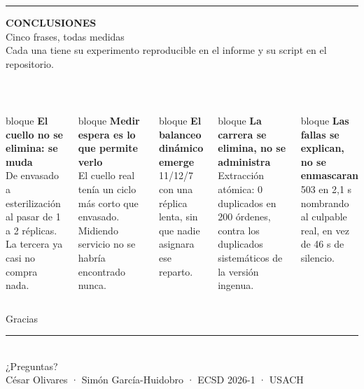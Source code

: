 \documentclass[aspectratio=169,10pt]{beamer}
\newcommand{\ligera}{\sffamily}
\newcommand{\antetitulo}{\sffamily\bfseries}
\newcommand{\lamina}[3]{%
  \vspace{0.05cm}%
  \noindent\textcolor{tealu}{\rule[-0.92cm]{2.6pt}{1.32cm}}\hspace{0.32cm}%
  \begin{minipage}[t]{0.92\linewidth}
    {\antetitulo\scriptsize\color{tealu}\MakeUppercase{#1}}\\[4pt]
    {\ligera\fontsize{19}{22}\selectfont\color{tinta}#2}\\[4pt]
    {\footnotesize\color{tinta2}#3}
  \end{minipage}\\[0.5cm]}
\newcommand{\bloque}[2]{%
  \begin{beamercolorbox}[wd=\linewidth, sep=7pt]{bloque}%
  {\small\bfseries\color{tinta}#1}\\[3pt]{\footnotesize\color{tinta2}#2}%
  \end{beamercolorbox}}
\begin{document}
\begin{frame}
\lamina{Conclusiones}{Cinco frases, todas medidas}
       {Cada una tiene su experimento reproducible en el informe y su script en el repositorio.}
\begin{columns}[T]
\bloque{El cuello no se elimina: se muda}{De envasado a esterilización al pasar de 1 a 2 réplicas. La tercera ya casi no compra nada.}
\vspace{0.12cm}
\bloque{Medir espera es lo que permite verlo}{El cuello real tenía un ciclo más corto que envasado. Midiendo servicio no se habría encontrado nunca.}
\vspace{0.12cm}
\bloque{El balanceo dinámico emerge}{11/12/7 con una réplica lenta, sin que nadie asignara ese reparto.}
\bloque{La carrera se elimina, no se administra}{Extracción atómica: 0 duplicados en 200 órdenes, contra los duplicados sistemáticos de la versión ingenua.}
\vspace{0.12cm}
\bloque{Las fallas se explican, no se enmascaran}{503 en 2,1 s nombrando al culpable real, en vez de 46 s de silencio.}
\end{columns}
\end{frame}

{
\begin{frame}[plain]
\vfill
\begin{center}
{\ligera\fontsize{34}{40}\selectfont\color{white}Gracias}\\[16pt]
{\color{tealu}\rule{2.6cm}{1.8pt}}\\[16pt]
{\small\color{grilla}¿Preguntas?}\\[26pt]
{\footnotesize\color{suave}César Olivares · Simón García-Huidobro · ECSD 2026-1 · USACH}
\end{center}
\vfill
\end{frame}}
\end{document}
